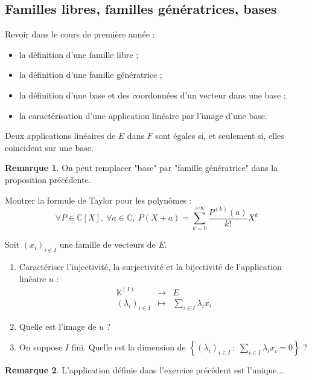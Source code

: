 \documentclass[french]{article}
\newcommand{\C}{\mathbb{C}}
\newcommand{\K}{\mathbb{K}}
\theoremstyle{plain}
\theoremstyle{definition}
\newtheorem*{rmq}{Remarque}
\theoremstyle{remark}
\begin{document}
\subsection{Familles libres, familles génératrices, bases}
Revoir dans le cours de première année :
\begin{itemize}
	\item la définition d'une famille libre ;
	\item la définition d'une famille génératrice ;
	\item la définition d'une base et des coordonnées d'un vecteur dans une base ;
	\item la caractérisation d'une application linéaire par l'image d'une base.
\end{itemize}

\begin{thm}
	Deux applications linéaires de $E$ dans $F$ sont égales si, et seulement si, elles coïncident sur une base.
\end{thm}

\begin{rmq}
	On peut remplacer "base" par "famille génératrice" dans la proposition précédente.
\end{rmq}

\begin{exo}
	Montrer la formule de Taylor pour les polynômes : $$\forall P\in\C[X],\ \forall a\in\C,\ P(X+a)=\sum_{k=0}^{+\infty}\frac{P^{(k)}(a)}{k!}X^k$$
\end{exo}

\begin{exo}
	Soit $(x_i)_{i\in I}$ une famille de vecteurs de $E$.
	\begin{enumerate}
		\item Caractériser l'injectivité, la surjectivité et la bijectivité de l'application linéaire $u$ : $$\begin{array}{rcl}
			\K^{(I)}&\longrightarrow&E \\
			(\lambda_i)_{i\in I}&\longmapsto&\displaystyle\sum_{i\in I}\lambda_i x_i
		\end{array}$$
		\item Quelle est l'image de $u$ ?
		\item On suppose $I$ fini. Quelle est la dimension de $\displaystyle\left\{(\lambda_i)_{i\in I}\ : \ \sum_{i\in I}\lambda_ix_i=0\right\}$ ?
	\end{enumerate}
\end{exo}

\begin{rmq}
	L'application définie dans l'exercice précédent est l'unique... %
\end{rmq}
\end{document}
